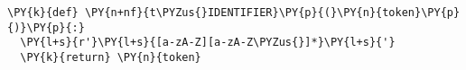 \begin{Verbatim}[commandchars=\\\{\}]
\PY{k}{def} \PY{n+nf}{t\PYZus{}IDENTIFIER}\PY{p}{(}\PY{n}{token}\PY{p}{)}\PY{p}{:}
  \PY{l+s}{r'}\PY{l+s}{[a-zA-Z][a-zA-Z\PYZus{}]*}\PY{l+s}{'}
  \PY{k}{return} \PY{n}{token}
\end{Verbatim}
